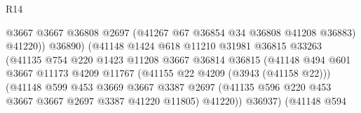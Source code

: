 \begin{lexlean}{R14}
\begin{coremodule}
                                            @3667
                                            @3667
                                            @36808
                                            @2697
                                            (@41267 @67 @36854 @34 @36808 @41208 @36883)
                                            @41220))
                                        @36890)
                                      (@41148
                                        @1424
                                        @618
                                        @11210
                                        @31981
                                        @36815
                                        @33263
                                        (@41135
                                          @754
                                          @220
                                          @1423
                                          @11208
                                          @3667
                                          @36814
                                          @36815
                                          (@41148
                                            @494
                                            @601
                                            @3667
                                            @11173
                                            @4209
                                            @11767
                                            (@41155 @22 @4209 (@3943 (@41158 @22)))
                                            (@41148
                                              @599
                                              @453
                                              @3669
                                              @3667
                                              @3387
                                              @2697
                                              (@41135
                                                @596
                                                @220
                                                @453
                                                @3667
                                                @3667
                                                @2697
                                                @3387
                                                @41220
                                                @11805)
                                              @41220))
                                          @36937)
                                        (@41148
                                          @594

\end{coremodule}
\end{lexlean}
